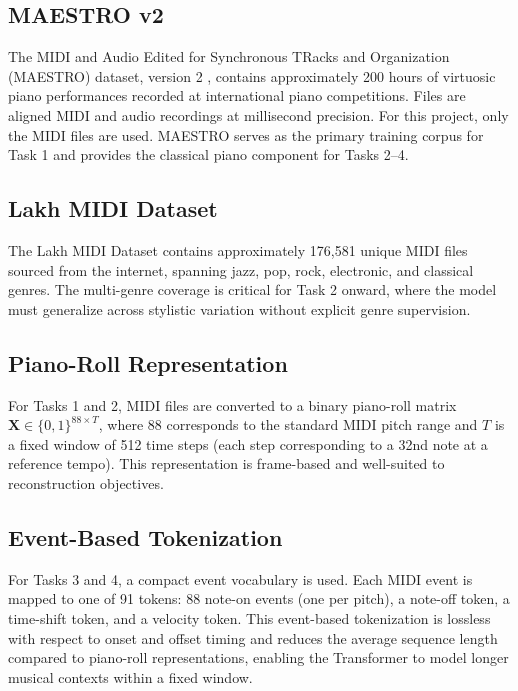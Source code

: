 \documentclass{article}
\begin{document}
\subsection{MAESTRO v2}

The MIDI and Audio Edited for Synchronous TRacks and Organization (MAESTRO) dataset, version 2 \cite{hawthorne2018enabling}, contains approximately 200 hours of virtuosic piano performances recorded at international piano competitions. Files are aligned MIDI and audio recordings at millisecond precision. For this project, only the MIDI files are used. MAESTRO serves as the primary training corpus for Task 1 and provides the classical piano component for Tasks 2--4.

\subsection{Lakh MIDI Dataset}

The Lakh MIDI Dataset \cite{raffel2016learning} contains approximately 176,581 unique MIDI files sourced from the internet, spanning jazz, pop, rock, electronic, and classical genres. The multi-genre coverage is critical for Task 2 onward, where the model must generalize across stylistic variation without explicit genre supervision.

\subsection{Piano-Roll Representation}

For Tasks 1 and 2, MIDI files are converted to a binary piano-roll matrix $\mathbf{X} \in \{0,1\}^{88 \times T}$, where 88 corresponds to the standard MIDI pitch range and $T$ is a fixed window of 512 time steps (each step corresponding to a 32nd note at a reference tempo). This representation is frame-based and well-suited to reconstruction objectives.

\subsection{Event-Based Tokenization}

For Tasks 3 and 4, a compact event vocabulary is used. Each MIDI event is mapped to one of 91 tokens: 88 note-on events (one per pitch), a note-off token, a time-shift token, and a velocity token. This event-based tokenization is lossless with respect to onset and offset timing and reduces the average sequence length compared to piano-roll representations, enabling the Transformer to model longer musical contexts within a fixed window.
\end{document}
